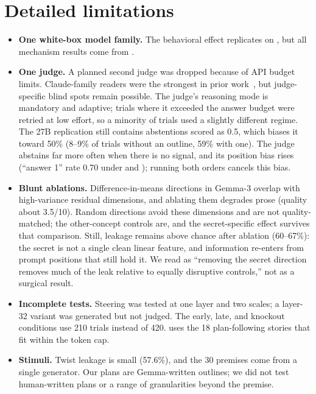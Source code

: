 \section{Detailed limitations}
\label{app:limitations}
\begin{itemize}[leftmargin=*,itemsep=0pt,topsep=0pt]
    \item {\bf One white-box model family.} The behavioral effect replicates on \gemmabig, but all mechanism results come from \gemma.
    \item {\bf One judge.} A planned second judge was dropped because of API budget limits. Claude-family readers were the strongest in prior work~\citep{holtzman2026secret}, but judge-specific blind spots remain possible. The judge's reasoning mode is mandatory and adaptive; trials where it exceeded the answer budget were retried at low effort, so a minority of trials used a slightly different regime. The 27B replication still contains abstentions scored as 0.5, which biases it toward 50\% (8--9\% of trials without an outline, 59\% with one). The judge abstains far more often when there is no signal, and its position bias rises (``answer 1'' rate 0.70 under \premise and \extplan); running both orders cancels this bias.
    \item {\bf Blunt ablations.} Difference-in-means directions in Gemma-3 overlap with high-variance residual dimensions, and ablating them degrades prose (quality about 3.5/10). Random directions avoid these dimensions and are not quality-matched; the other-concept controls are, and the secret-specific effect survives that comparison. Still, leakage remains above chance after ablation (60--67\%): the secret is not a single clean linear feature, and information re-enters from prompt positions that still hold it. We read \mthree as ``removing the secret direction removes much of the leak relative to equally disruptive controls,'' not as a surgical result.
    \item {\bf Incomplete tests.} Steering was tested at one layer and two scales; a layer-32 variant was generated but not judged. The early, late, and knockout conditions use 210 trials instead of 420. \monebee uses the 18 plan-following stories that fit within the token cap.
    \item {\bf Stimuli.} Twist leakage is small (57.6\%), and the 30 premises come from a single generator. Our plans are Gemma-written outlines; we did not test human-written plans or a range of granularities beyond the premise.
\end{itemize}
\FloatBarrier
